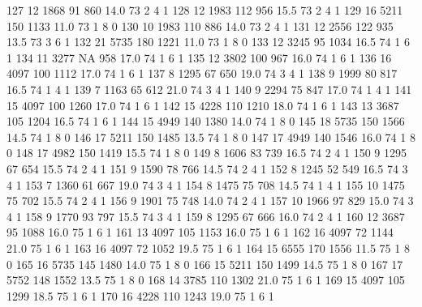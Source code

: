 \documentclass{article}
\begin{document}
\begin{Schunk}
\begin{Soutput}
127      12  1868  91  860 14.0  73      2       4        1
128      12  1983 112  956 15.5  73      2       4        1
129      16  5211 150 1133 11.0  73      1       8        0
130      10  1983 110  886 14.0  73      2       4        1
131      12  2556 122  935 13.5  73      3       6        1
132      21  5735 180 1221 11.0  73      1       8        0
133      12  3245  95 1034 16.5  74      1       6        1
134      11  3277  NA  958 17.0  74      1       6        1
135      12  3802 100  967 16.0  74      1       6        1
136      16  4097 100 1112 17.0  74      1       6        1
137       8  1295  67  650 19.0  74      3       4        1
138       9  1999  80  817 16.5  74      1       4        1
139       7  1163  65  612 21.0  74      3       4        1
140       9  2294  75  847 17.0  74      1       4        1
141      15  4097 100 1260 17.0  74      1       6        1
142      15  4228 110 1210 18.0  74      1       6        1
143      13  3687 105 1204 16.5  74      1       6        1
144      15  4949 140 1380 14.0  74      1       8        0
145      18  5735 150 1566 14.5  74      1       8        0
146      17  5211 150 1485 13.5  74      1       8        0
147      17  4949 140 1546 16.0  74      1       8        0
148      17  4982 150 1419 15.5  74      1       8        0
149       8  1606  83  739 16.5  74      2       4        1
150       9  1295  67  654 15.5  74      2       4        1
151       9  1590  78  766 14.5  74      2       4        1
152       8  1245  52  549 16.5  74      3       4        1
153       7  1360  61  667 19.0  74      3       4        1
154       8  1475  75  708 14.5  74      1       4        1
155      10  1475  75  702 15.5  74      2       4        1
156       9  1901  75  748 14.0  74      2       4        1
157      10  1966  97  829 15.0  74      3       4        1
158       9  1770  93  797 15.5  74      3       4        1
159       8  1295  67  666 16.0  74      2       4        1
160      12  3687  95 1088 16.0  75      1       6        1
161      13  4097 105 1153 16.0  75      1       6        1
162      16  4097  72 1144 21.0  75      1       6        1
163      16  4097  72 1052 19.5  75      1       6        1
164      15  6555 170 1556 11.5  75      1       8        0
165      16  5735 145 1480 14.0  75      1       8        0
166      15  5211 150 1499 14.5  75      1       8        0
167      17  5752 148 1552 13.5  75      1       8        0
168      14  3785 110 1302 21.0  75      1       6        1
169      15  4097 105 1299 18.5  75      1       6        1
170      16  4228 110 1243 19.0  75      1       6        1

\end{Soutput}
\end{Schunk}
\end{document}
